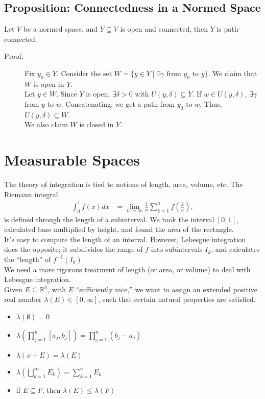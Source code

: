 \documentclass[10pt]{extarticle}
\newcommand{\R}{\mathbb{R}}
\begin{document}
  \subsection{Proposition: Connectedness in a Normed Space}%
  Let $V$ be a normed space, and $Y\subseteq V$ is open and connected, then $Y$ is path-connected.
  \begin{description}
    \item[Proof:] Fix $y_0\in Y$. Consider the set $W = \{y\in Y\mid \exists \gamma\text{ from $y_0$ to $y$}\}$. We claim that $W$ is open in $Y$.\\

      Let $y\in W$. Since $Y$ is open, $\exists \delta > 0$ with $U(y,\delta)\subseteq Y$. If $w\in U(y,\delta)$, $\exists \gamma$ from $y$ to $w$. Concatenating, we get a path from $y_0$ to $w$. Thus, $U(y,\delta)\subseteq W$.\\

      We also claim $W$ is closed in $Y$.
  \end{description}
  \section{Measurable Spaces}%
  The theory of integration is tied to notions of length, area, volume, etc. The Riemann integral
  \begin{align*}
    \int_{0}^{1} f(x)dx &= \lim_{n\rightarrow\infty}\frac{1}{n}\sum_{k=1}^{n}f\left(\frac{k}{n}\right),
  \end{align*}
  is defined through the length of a subinterval. We took the interval $[0,1]$, calculated base multiplied by height, and found the area of the rectangle.\\

  It's easy to compute the length of an interval. However, Lebesgue integration does the opposite; it subdivides the range of $f$ into subintervals $I_k$, and calculates the ``length'' of $f^{-1}(I_k)$.\\

  We need a more rigorous treatment of length (or area, or volume) to deal with Lebesgue integration.\\

  Given $E\subseteq \R^n$, with $E$ ``sufficiently nice,'' we want to assign an extended positive real number $\lambda(E)\in [0,\infty]$, such that certain natural properties are satisfied.
  \begin{itemize}
    \item $\lambda(\emptyset) = 0$
    \item $\displaystyle \lambda \left(\prod_{j=1}^{n}[a_j,b_j]\right) = \prod_{j=1}^{n}(b_j-a_j)$
    \item $\lambda(x + E) = \lambda(E)$
    \item $\displaystyle \lambda \left(\bigsqcup_{k=1}^{\infty}E_k\right) = \sum_{k=1}^{n}E_k$
    \item if $E\subseteq F$, then $\lambda(E)\leq \lambda(F)$
  \end{itemize}
\end{document}
